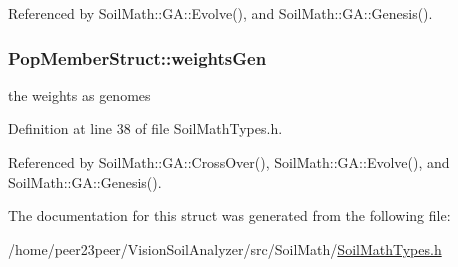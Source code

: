 Referenced by Soil\+Math\+::\+G\+A\+::\+Evolve(), and Soil\+Math\+::\+G\+A\+::\+Genesis().

\hypertarget{struct_pop_member_struct_a072fadb4863e0cf77b55ad3b46b62522}{}
\subsubsection[{weights\+Gen}]{ Pop\+Member\+Struct\+::weights\+Gen}\label{struct_pop_member_struct_a072fadb4863e0cf77b55ad3b46b62522}
the weights as genomes 

Definition at line 38 of file Soil\+Math\+Types.\+h.



Referenced by Soil\+Math\+::\+G\+A\+::\+Cross\+Over(), Soil\+Math\+::\+G\+A\+::\+Evolve(), and Soil\+Math\+::\+G\+A\+::\+Genesis().



The documentation for this struct was generated from the following file\+:\begin{DoxyCompactItemize}
\item 
/home/peer23peer/\+Vision\+Soil\+Analyzer/src/\+Soil\+Math/\hyperlink{_soil_math_types_8h}{Soil\+Math\+Types.\+h}\end{DoxyCompactItemize}
